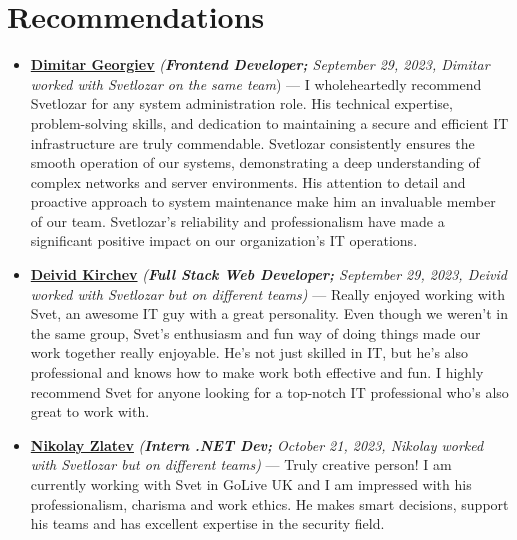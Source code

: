 \documentclass[letterpaper, 10pt]{article}
\begin{document}
	\section*{Recommendations}
\begin{itemize}
	\item \textbf{\href{https://www.linkedin.com/in/dimitar-georgiev-29a6ab144/}{Dimitar
			Georgiev}} \textit{(\textbf{Frontend Developer;} September 29, 2023, Dimitar worked with Svetlozar on the same team}) — I wholeheartedly recommend Svetlozar for any system
	administration role. His technical expertise, problem-solving skills, and dedication
	to maintaining a secure and efficient IT infrastructure are truly commendable.
	Svetlozar consistently ensures the smooth operation of our systems, demonstrating
	a deep understanding of complex networks and server environments. His
	attention to detail and proactive approach to system maintenance make him
	an invaluable member of our team. Svetlozar’s reliability and professionalism
	have made a significant positive impact on our organization’s IT operations.\\
	
	\item \textbf{\href{https://www.linkedin.com/in/deivid-kirchev-00378b252/}{Deivid
			Kirchev}} \textit{(\textbf{Full Stack Web Developer;} September 29, 2023, Deivid worked with Svetlozar but on different teams)} — Really enjoyed working with Svet, an awesome IT guy with a great
	personality. Even though we weren’t in the same group, Svet’s enthusiasm and
	fun way of doing things made our work together really enjoyable. He’s not
	just skilled in IT, but he’s also professional and knows how to make work both
	effective and fun. I highly recommend Svet for anyone looking for a top-notch
	IT professional who’s also great to work with.\\
	
	\item \textbf{\href{https://www.linkedin.com/in/nikolay-zlatev/}{Nikolay
			Zlatev}} \textit{(\textbf{Intern .NET Dev;} October 21, 2023, Nikolay worked with Svetlozar but on different teams)} — Truly creative person! I am currently working with Svet in GoLive
	UK and I am impressed with his professionalism, charisma and work ethics. He
	makes smart decisions, support his teams and has excellent expertise in
	the security field.
	

\end{itemize}
\end{document}
